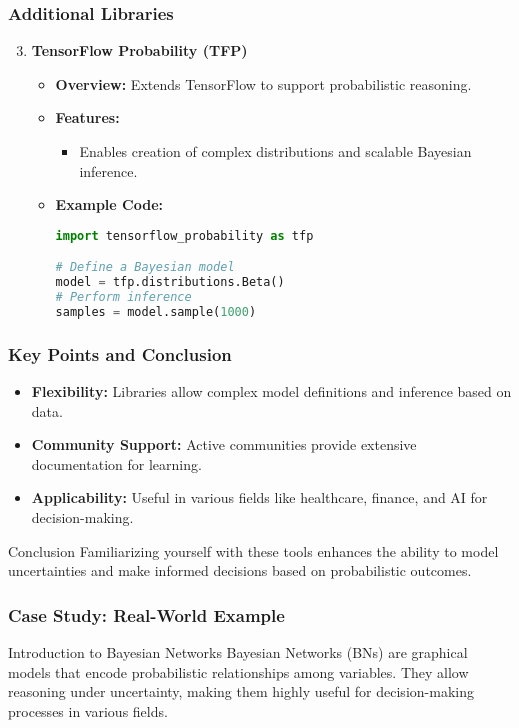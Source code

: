 \documentclass[aspectratio=169]{beamer}
\begin{document}
\begin{frame}[fragile]
    \frametitle{Additional Libraries}
    \begin{enumerate}
        \setcounter{enumi}{2} %
        \item \textbf{TensorFlow Probability (TFP)}
            \begin{itemize}
                \item \textbf{Overview:} Extends TensorFlow to support probabilistic reasoning.
                \item \textbf{Features:}
                    \begin{itemize}
                        \item Enables creation of complex distributions and scalable Bayesian inference.
                    \end{itemize}
                \item \textbf{Example Code:}
                \begin{lstlisting}[language=Python]
import tensorflow_probability as tfp

# Define a Bayesian model
model = tfp.distributions.Beta()
# Perform inference
samples = model.sample(1000)
                \end{lstlisting}
            \end{itemize}
    \end{enumerate}
\end{frame}

\begin{frame}
    \frametitle{Key Points and Conclusion}
    \begin{itemize}
        \item \textbf{Flexibility:} Libraries allow complex model definitions and inference based on data.
        \item \textbf{Community Support:} Active communities provide extensive documentation for learning.
        \item \textbf{Applicability:} Useful in various fields like healthcare, finance, and AI for decision-making.
    \end{itemize}
    \begin{block}{Conclusion}
        Familiarizing yourself with these tools enhances the ability to model uncertainties and make informed decisions based on probabilistic outcomes. 
    \end{block}
\end{frame}

\begin{frame}[fragile]
    \frametitle{Case Study: Real-World Example}
    \begin{block}{Introduction to Bayesian Networks}
        Bayesian Networks (BNs) are graphical models that encode probabilistic relationships among variables. They allow reasoning under uncertainty, making them highly useful for decision-making processes in various fields.
    \end{block}
\end{frame}
\end{document}
